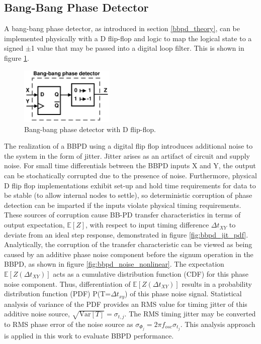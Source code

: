 	\subsection{Bang-Bang Phase Detector}
		A bang-bang phase detector, as introduced in section \ref{bbpd_theory}, can be implemented physically with a D flip-flop \cite{Razavi2020} and logic to map the logical state to a signed $\pm$1 value that may be passed into a digital loop filter. This is shown in figure \ref{fig:bbpd_dff}. 

		\begin{figure}[htb!]
			\center\includegraphics[width=0.4\textwidth, angle=0]{./figs/design/bbpd_}
			\caption{Bang-bang phase detector with D flip-flop.}
			\label{fig:bbpd_dff}
		\end{figure}
		The realization of a BBPD using a digital flip flop introduces additional noise to the system in the form of jitter. Jitter arises as an artifact of circuit and supply noise. For small time differentials between the BBPD inputs X and Y, the output can be stochatically corrupted due to the presence of noise. Furthermore, physical D flip flop implementations exhibit set-up and hold time requirements for data to be stable (to allow internal nodes to settle), so deterministic corruption of phase detection can be imparted if the inputs violate physical timing requirements. These sources of corruption cause BB-PD transfer characteristics in terms of output expectation, $\mathbb{E}[Z]$, with respect to input timing difference $\Delta t_{XY}$ to deviate from an ideal step response, demonstrated in figure \ref{fig:bbpd_jit_pdf}. Analytically, the corruption of the transfer characteristic can be viewed as being caused by an additive phase noise component before the signum operation in the BBPD, as shown in figure \ref{fig:bbpd_noise_nonlinear}. The expectation $\mathbb{E}[Z(\Delta t_{XY})]$ acts as a cumulative distribution function (CDF) for this phase noise component. Thus, differentiation of $\mathbb{E}[Z(\Delta t_{XY})]$ results in a probability distribution function (PDF) P(T=$\Delta t_{xy}$) of this phase noise signal. Statistical analysis of variance of the PDF provides an RMS value for timing jitter of this additive noise source, $\sqrt{\mathrm{Var}[T]} = \sigma_{t,j}$. The RMS timing jitter may be converted to RMS phase error of the noise source as $\sigma_{\Phi_j} = 2\pi f_{osc}\sigma_{t_j}$. This analysis approach is applied in this work to evaluate BBPD performance.
 
